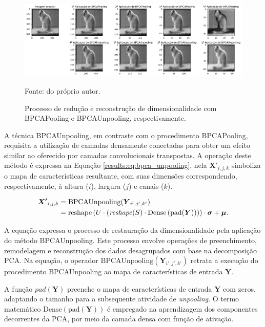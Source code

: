 \begin{figure}[H]
    \centering
    \caption{Processo de redução e reconstrução de dimensionalidade com BPCAPooling e BPCAUnpooling, respectivamente.}
    \label{results:fig:future:0}
    \includegraphics[width=1\textwidth]{recursos/imagens/results/bpca_unpooling.png}

    Fonte: do próprio autor.
\end{figure}

A técnica BPCAUnpooling, em contraste com o procedimento BPCAPooling, requisita a utilização de camadas densamente conectadas para obter um efeito similar ao oferecido por camadas convolucionais transpostas. A operação deste método é expressa na Equação \ref{results:eq:bpca_unpooling}, nela $\boldsymbol{X'}_{i,j,k}$ simboliza o mapa de características resultante, com suas dimensões correspondendo, respectivamente, à altura ($i$), largura ($j$) e canais ($k$).

\begin{equation}
    \label{results:eq:bpca_unpooling}
    \begin{split}
        \boldsymbol{X'}_{i,j,k} &= \text{BPCAUnpooling}(\boldsymbol{Y}_{i',j',k'}) \\
                  &= \text{reshape}\left(U \cdot \left(\text{\textit{reshape}}(S) \cdot \text{Dense}\left(\text{pad}(\boldsymbol{Y})\right)\right)\right) \cdot {\boldsymbol{\sigma}} + {\boldsymbol{\mu}}.
    \end{split}
\end{equation}

A equação expressa o processo de restauração da dimensionalidade pela aplicação do método BPCAUnpooling. Este processo envolve operações de preenchimento, remodelagem e reconstrução dos dados desagrupados com base na decomposição PCA. Na equação, o operador $\text{BPCAUnpooling}(\boldsymbol{Y}_{i',j',k'})$ retrata a execução do procedimento BPCAUnpooling ao mapa de características de entrada $\boldsymbol{Y}$.

A função $pad(\boldsymbol{Y})$ preenche o mapa de características de entrada $\boldsymbol{Y}$ com zeros, adaptando o tamanho para a subsequente atividade de \textit{unpooling}. O termo matemático $\text{Dense}(\text{pad}(\boldsymbol{Y}))$ é empregado na aprendizagem dos componentes decorrentes da PCA, por meio da camada densa com função de ativação.

